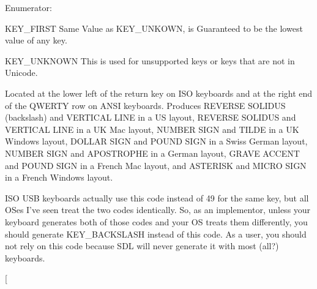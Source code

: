 \begin{Desc}
\item[Enumerator: ]\par
\begin{description}
\item[{\em 
\hypertarget{classphys_1_1MetaCode_a3e501cbb5bf0f6f1fdb7211465bda8d8a45d7f3824a440f5bea5e616a6d6ea0b5}{
KEY\_\-FIRST}
\label{classphys_1_1MetaCode_a3e501cbb5bf0f6f1fdb7211465bda8d8a45d7f3824a440f5bea5e616a6d6ea0b5}
}]KEY\_\-FIRST Same Value as KEY\_\-UNKOWN, is Guaranteed to be the lowest value of any key. \item[{\em 
\hypertarget{classphys_1_1MetaCode_a3e501cbb5bf0f6f1fdb7211465bda8d8a061a36c9b5d9661314fd9d276b33042f}{
KEY\_\-UNKNOWN}
\label{classphys_1_1MetaCode_a3e501cbb5bf0f6f1fdb7211465bda8d8a061a36c9b5d9661314fd9d276b33042f}
}]KEY\_\-UNKNOWN This is used for unsupported keys or keys that are not in Unicode. \item[{\em 
\hypertarget{classphys_1_1MetaCode_a3e501cbb5bf0f6f1fdb7211465bda8d8acab0c272975d1667521cd5ae918e9b8e}{
KEY\_\-BACKSLASH}
\label{classphys_1_1MetaCode_a3e501cbb5bf0f6f1fdb7211465bda8d8acab0c272975d1667521cd5ae918e9b8e}
}]Located at the lower left of the return key on ISO keyboards and at the right end of the QWERTY row on ANSI keyboards. Produces REVERSE SOLIDUS (backslash) and VERTICAL LINE in a US layout, REVERSE SOLIDUS and VERTICAL LINE in a UK Mac layout, NUMBER SIGN and TILDE in a UK Windows layout, DOLLAR SIGN and POUND SIGN in a Swiss German layout, NUMBER SIGN and APOSTROPHE in a German layout, GRAVE ACCENT and POUND SIGN in a French Mac layout, and ASTERISK and MICRO SIGN in a French Windows layout. \item[{\em 
\hypertarget{classphys_1_1MetaCode_a3e501cbb5bf0f6f1fdb7211465bda8d8afd23349e045ee52f42e1c5c25ee3cec3}{
KEY\_\-NONUSHASH}
\label{classphys_1_1MetaCode_a3e501cbb5bf0f6f1fdb7211465bda8d8afd23349e045ee52f42e1c5c25ee3cec3}
}]ISO USB keyboards actually use this code instead of 49 for the same key, but all OSes I've seen treat the two codes identically. So, as an implementor, unless your keyboard generates both of those codes and your OS treats them differently, you should generate KEY\_\-BACKSLASH instead of this code. As a user, you should not rely on this code because SDL will never generate it with most (all?) keyboards. \item[{\em 
}
\end{description}
\end{Desc}
